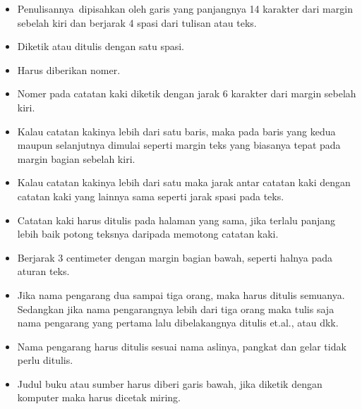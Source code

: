 \begin{itemize}
	\item Penulisannya dipisahkan oleh garis yang panjangnya 14 karakter dari margin sebelah kiri dan berjarak 4 spasi dari tulisan atau teks.\par

	\item Diketik atau ditulis dengan satu spasi.\par

	\item Harus diberikan nomer.\par

	\item Nomer pada catatan kaki diketik dengan jarak 6 karakter dari margin sebelah kiri.\par

	\item Kalau catatan kakinya lebih dari satu baris, maka pada baris yang kedua maupun selanjutnya dimulai seperti margin teks yang biasanya tepat pada margin bagian sebelah kiri.\par

	\item Kalau catatan kakinya lebih dari satu maka jarak antar catatan kaki dengan catatan kaki yang lainnya sama seperti jarak spasi pada teks.\par

	\item Catatan kaki harus ditulis pada halaman yang sama, jika terlalu panjang lebih baik potong teksnya daripada memotong catatan kaki.\par

	\item Berjarak 3 centimeter dengan margin bagian bawah, seperti halnya pada aturan teks.\par

	\item Jika nama pengarang dua sampai tiga orang, maka harus ditulis semuanya. Sedangkan jika nama pengarangnya lebih dari tiga orang maka tulis saja nama pengarang yang pertama lalu dibelakangnya ditulis et.al., atau dkk.\par

	\item Nama pengarang harus ditulis sesuai nama aslinya, pangkat dan gelar tidak perlu ditulis.\par

	\item Judul buku atau sumber harus diberi garis bawah, jika diketik dengan komputer maka harus dicetak miring.\par


\end{itemize}

